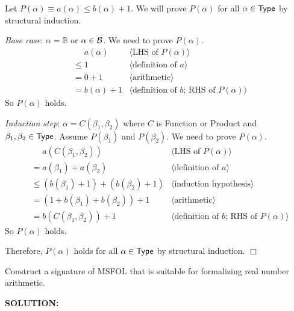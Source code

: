\documentclass[11pt,fleqn]{article}
\newcommand{\sglsp}{\ }
\newcommand{\mname}[1]{\mbox{\sf #1}}
\newenvironment{proof}{\par\noindent{\bf Proof\sglsp}}{\hfill$\Box$}
\newcommand{\pnote}[1]{{\langle \text{#1} \rangle}}
\newcommand{\sB}{\mbox{$\cal B$}}
\begin{document}
\begin{proof}
Let $P(\alpha) \equiv a(\alpha) \le b(\alpha) + 1$.  We will prove
$P(\alpha)$ for all $\alpha \in \mname{Type}$ by structural induction.

\medskip

\emph{Base case}: $\alpha = \mathbb{B}$ or $\alpha \in \sB$.
We need to prove $P(\alpha)$.
\begin{align*}
  &\phantom{{}=} a(\alpha)   & \pnote{LHS of $P(\alpha)$}\\
  &\le 1                     & \pnote{definition of $a$}\\
  &=   0 + 1                 & \pnote{arithmetic}\\
  &= b(\alpha) + 1           & \pnote{definition of $b$; RHS of $P(\alpha)$}
\end{align*}
So $P(\alpha)$ holds.

\emph{Induction step}: $\alpha = C(\beta_1,\beta_2)$ where $C$ is
\mname{Function} or \mname{Product} and $\beta_1,\beta_2 \in
\mname{Type}$.  Assume $P(\beta_1)$ and $P(\beta_2)$.  We need to
prove $P(\alpha)$.
\begin{align*}
  &\phantom{{}=} a(C(\beta_1,\beta_2))      & \pnote{LHS of $P(\alpha)$}\\
  &= a(\beta_1) + a(\beta_2)                & \pnote{definition of $a$}\\
  &\le  (b(\beta_1) + 1) + (b(\beta_2) + 1) & \pnote{induction hypothesis}\\
  &= (1 + b(\beta_1) + b(\beta_2)) + 1      & \pnote{arithmetic}\\
  &= b(C(\beta_1,\beta_2)) + 1          & \pnote{definition of $b$; RHS of $P(\alpha)$}
\end{align*}
So $P(\alpha)$ holds.

\medskip

Therefore, $P(\alpha)$ holds for all $\alpha \in \mname{Type}$ by
structural induction.
\end{proof}

  \item Construct a signature of MSFOL that is suitable for 
    formalizing real number arithmetic.
    
    \textbf{SOLUTION:}
    
\end{document}
